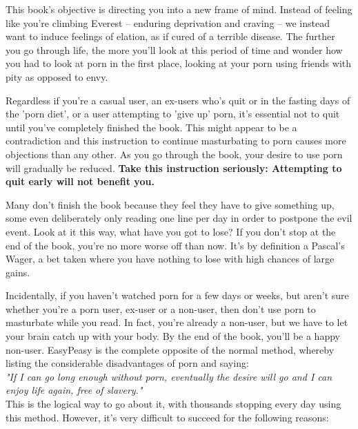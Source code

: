 \documentclass[easypeasy.tex]{subfiles}
\begin{document}
This book's objective is directing you into a new frame of mind. Instead of feeling like you're climbing Everest -- enduring deprivation and craving -- we instead want to induce feelings of elation, as if cured of a terrible disease. The further you go through life, the more you'll look at this period of time and wonder how you had to look at porn in the first place, looking at your porn using friends with pity as opposed to envy.

Regardless if you're a casual user, an ex-users who's quit or in the fasting days of the 'porn diet', or a user attempting to 'give up' porn, it's essential not to quit until you've completely finished the book. This might appear to be a contradiction and this instruction to continue masturbating to porn causes more objections than any other. As you go through the book, your desire to use porn will gradually be reduced. \textbf{Take this instruction seriously: Attempting to quit early will not benefit you.}

Many don't finish the book because they feel they have to give something up, some even deliberately only reading one line per day in order to postpone the evil event. Look at it this way, what have you got to lose? If you don't stop at the end of the book, you're no more worse off than now. It's by definition a Pascal's Wager, a bet taken where you have nothing to lose with high chances of large gains.

Incidentally, if you haven't watched porn for a few days or weeks, but aren't sure whether you're a porn user, ex-user or a non-user, then don't use porn to masturbate while you read. In fact, you're already a non-user, but we have to let your brain catch up with your body. By the end of the book, you'll be a happy non-user. EasyPeasy is the complete opposite of the normal method, whereby listing the considerable disadvantages of porn and saying: \\
\textit{"If I can go long enough without porn, eventually the desire will go and I can enjoy life again, free of slavery."} \\
This is the logical way to go about it, with thousands stopping every day using this method. However, it's very difficult to succeed for the following reasons:
\end{document}
